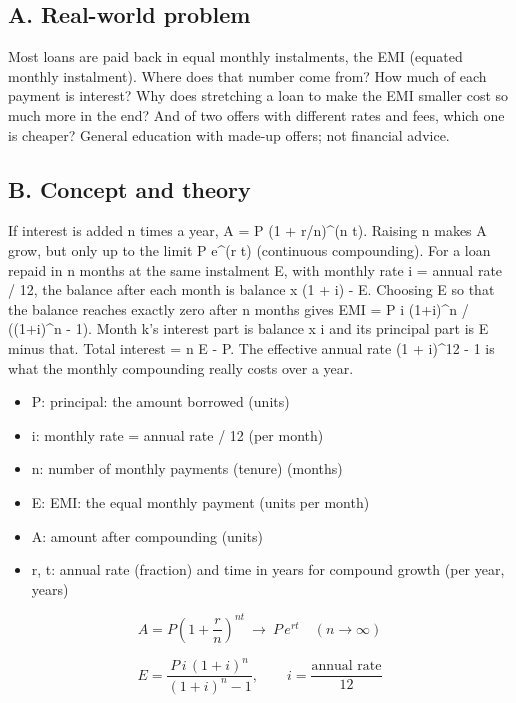 \documentclass[11pt,a4paper]{article}
\begin{document}
\subsection*{A. Real-world problem}
Most loans are paid back in equal monthly instalments, the EMI (equated monthly instalment). Where does that number come from? How much of each payment is interest? Why does stretching a loan to make the EMI smaller cost so much more in the end? And of two offers with different rates and fees, which one is cheaper? General education with made-up offers; not financial advice.

\subsection*{B. Concept and theory}
If interest is added n times a year, A = P (1 + r/n)\textasciicircum{}(n t). Raising n makes A grow, but only up to the limit P e\textasciicircum{}(r t) (continuous compounding). For a loan repaid in n months at the same instalment E, with monthly rate i = annual rate / 12, the balance after each month is balance x (1 + i) - E. Choosing E so that the balance reaches exactly zero after n months gives EMI = P i (1+i)\textasciicircum{}n / ((1+i)\textasciicircum{}n - 1). Month k's interest part is balance x i and its principal part is E minus that. Total interest = n E - P. The effective annual rate (1 + i)\textasciicircum{}12 - 1 is what the monthly compounding really costs over a year.

\begin{itemize}[nosep]
\item P: principal: the amount borrowed (units)
\item i: monthly rate = annual rate / 12 (per month)
\item n: number of monthly payments (tenure) (months)
\item E: EMI: the equal monthly payment (units per month)
\item A: amount after compounding (units)
\item r, t: annual rate (fraction) and time in years for compound growth (per year, years)
\end{itemize}

\begin{equation*}
A=P\left(1+\frac{r}{n}\right)^{nt}\ \longrightarrow\ P\,e^{rt}\quad (n\to\infty)
\end{equation*}

\begin{equation*}
E=\frac{P\,i\,(1+i)^{n}}{(1+i)^{n}-1},\qquad i=\frac{\text{annual rate}}{12}
\end{equation*}
\end{document}
